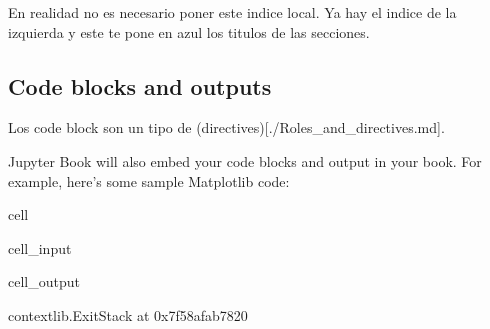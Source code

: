 \documentclass[letterpaper,10pt,english]{jupyterBook}
\begin{document}
\sphinxAtStartPar
En realidad no es necesario poner este indice local. Ya hay el indice de la izquierda y este te pone en azul los titulos de las secciones.


\subsection{Code blocks and outputs}
\label{\detokenize{docs/01_01_Code_Blocks:code-blocks-and-outputs}}
\sphinxAtStartPar
Los code block son un tipo de (directives){[}./Roles\_and\_directives.md{]}.

\sphinxAtStartPar
Jupyter Book will also embed your code blocks and output in your book.
For example, here’s some sample Matplotlib code:

\begin{sphinxuseclass}{cell}\begin{sphinxVerbatimInput}

\begin{sphinxuseclass}{cell_input}
\begin{sphinxVerbatim}[commandchars=\\\{\}]
    
   
   
\end{sphinxVerbatim}

\end{sphinxuseclass}\end{sphinxVerbatimInput}
\begin{sphinxVerbatimOutput}

\begin{sphinxuseclass}{cell_output}
\begin{sphinxVerbatim}[commandchars=\\\{\}]
\PYGZlt{}contextlib.ExitStack at 0x7f58afab7820\PYGZgt{}
\end{sphinxVerbatim}

\end{sphinxuseclass}\end{sphinxVerbatimOutput}

\end{sphinxuseclass}
\end{document}
